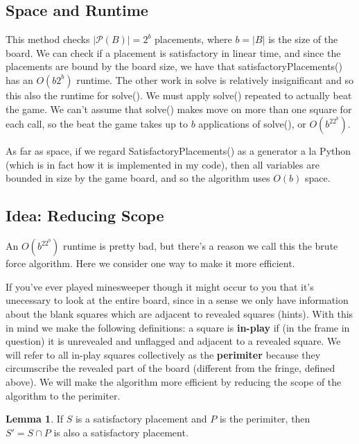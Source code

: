 \documentclass{article}
\theoremstyle{definition}
\theoremstyle{definition}
\theoremstyle{theorem}
\newtheorem*{lemma}{Lemma}
\begin{document}
	\subsection*{Space and Runtime}
	 This method checks $|\mathcal{P}(B)| = 2^{b}$ placements, where $b = |B|$ is the size of the board. We can check if a placement is satisfactory in linear time, and since the placements are bound by the board size, we have that satisfactoryPlacements() has an $O(b2^{b})$ runtime. The other work in solve is relatively insignificant and so this also the runtime for solve(). We must apply solve() repeated to actually beat the game. We can't assume that solve() makes move on more than one square for each call, so the beat the game takes up to $b$ applications of solve(), or $O(b^22^{b})$.
	 
	 As far as space, if we regard SatisfactoryPlacements() as a generator a la Python (which is in fact how it is implemented in my code), then all variables are bounded in size by the game board, and so the algorithm uses $O(b)$ space.
	 
	 \subsection*{Idea: Reducing Scope}
	 An $O(b^22^{b})$ runtime is pretty bad, but there's a reason we call this the brute force algorithm. Here we consider one way to make it more efficient.
	 
	 If you've ever played minesweeper though it might occur to you that it's unecessary to look at the entire board, since in a sense we only have information about the blank squares which are adjacent to revealed squares (hints). With this in mind we make the following definitions: a square is \textbf{in-play} if (in the frame in question) it is unrevealed and unflagged and adjacent to a revealed square. We will refer to all in-play squares collectively as the \textbf{perimiter} because they circumscribe the revealed part of the board (different from the fringe, defined above). We will make the algorithm more efficient by reducing the scope of the algorithm to the perimiter.
	
	\begin{lemma}
		If $S$ is a satisfactory placement and $P$ is the perimiter,  then $S' = S \cap P$ is also a satisfactory placement.
	\end{lemma}
\end{document}
